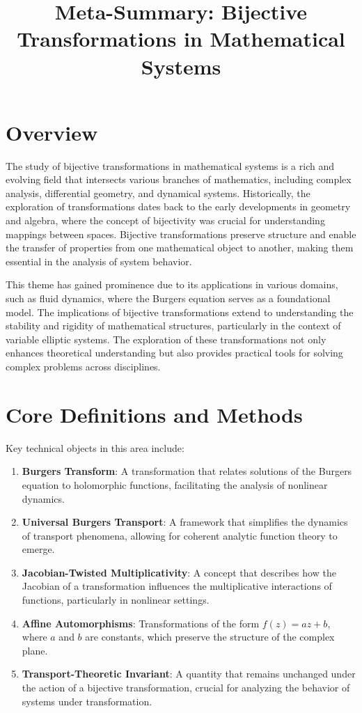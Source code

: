 \documentclass[11pt,a4paper]{article}
\title{Meta-Summary: Bijective Transformations in Mathematical Systems}
\date{}
\begin{document}
\maketitle

\section{Overview}
The study of bijective transformations in mathematical systems is a rich and evolving field that intersects various branches of mathematics, including complex analysis, differential geometry, and dynamical systems. Historically, the exploration of transformations dates back to the early developments in geometry and algebra, where the concept of bijectivity was crucial for understanding mappings between spaces. Bijective transformations preserve structure and enable the transfer of properties from one mathematical object to another, making them essential in the analysis of system behavior.

This theme has gained prominence due to its applications in various domains, such as fluid dynamics, where the Burgers equation serves as a foundational model. The implications of bijective transformations extend to understanding the stability and rigidity of mathematical structures, particularly in the context of variable elliptic systems. The exploration of these transformations not only enhances theoretical understanding but also provides practical tools for solving complex problems across disciplines.

\section{Core Definitions and Methods}
Key technical objects in this area include:

\begin{enumerate}
\item \textbf{Burgers Transform}: A transformation that relates solutions of the Burgers equation to holomorphic functions, facilitating the analysis of nonlinear dynamics.
\item \textbf{Universal Burgers Transport}: A framework that simplifies the dynamics of transport phenomena, allowing for coherent analytic function theory to emerge.
\item \textbf{Jacobian-Twisted Multiplicativity}: A concept that describes how the Jacobian of a transformation influences the multiplicative interactions of functions, particularly in nonlinear settings.
\item \textbf{Affine Automorphisms}: Transformations of the form \( f(z) = az + b \), where \( a \) and \( b \) are constants, which preserve the structure of the complex plane.
\item \textbf{Transport-Theoretic Invariant}: A quantity that remains unchanged under the action of a bijective transformation, crucial for analyzing the behavior of systems under transformation.
\end{enumerate}
\end{document}
